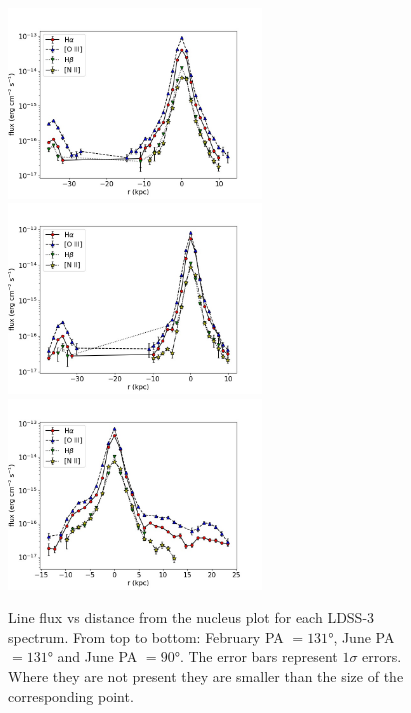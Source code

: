 \documentclass[../main.tex]{subfiles}
\begin{document}
\begin{figure}
\centering
\includegraphics[width=0.6\textwidth]{images/paper3/PA131_2016_line_flux.jpg}\\ 
\includegraphics[width=0.6\textwidth]{images/paper3/PA131_line_flux.jpg}\\ 
\includegraphics[width=0.6\textwidth]{images/paper3/PA90_line_flux.jpg}\\ 
\caption[]{Line flux vs distance from the nucleus plot for each LDSS-3 spectrum. From top to bottom: February PA $=\ang{131}$, June PA $=\ang{131}$ and June PA $=\ang{90}$. The error bars represent $1\sigma$ errors. Where they are not present they are smaller than the size of the corresponding point.} 
\label{fig:line_fluxes}
\end{figure} 
\end{document}
